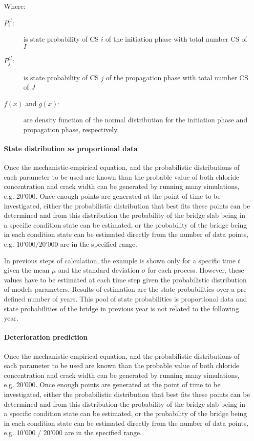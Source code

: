 Where:%
\begin{adjustwidth}{1cm}{}
\begin{description}
\item[$P_i^{cl}$:] is state probability of CS $i$ of the initiation phase with total number CS of $I$
\item[$P_j^{cl}$:] is state probability of CS $j$ of the propagation phase with total number CS of $J$
\item[$f(x)$ and $g(x)$:] are density function of the normal distribution for the initiation phase and propagation phase, respectively.
\end{description}
\end{adjustwidth}
\paragraph{State distribution as proportional data}
Once the mechanistic-empirical equation, and the probabilistic distributions of each parameter to be used are known than the probable value of both chloride concentration and crack width can be generated by running many simulations, e.g. $20’000$. Once enough points are generated at the point of time to be investigated, either the probabilistic distribution that best fits these points can be determined and from this distribution the probability of the bridge slab being in a specific condition state can be estimated, or the probability of the bridge being in each condition state can be estimated directly from the number of data points, e.g. $10’000/20’000$ are in the specified range. 

In previous steps of calculation, the example is shown only for a specific time $t$ given the mean $\mu$ and the standard deviation $\sigma$ for each process. However, these values have to be estimated at each time step given the probabilistic distribution of models parameters. Results of estimation are the state probabilities over a pre-defined number of years. This pool of state probabilities is proportional data and state probabilities of the bridge in previous year is not related to the following year.

\paragraph{Deterioration prediction}

Once the mechanistic-empirical equation, and the probabilistic distributions of each parameter to be used are known than the probable value of both chloride concentration and crack width can be generated by running many simulations, e.g. 20'000. Once enough points are generated at the point of time to be investigated, either the probabilistic distribution that best fits these points can be determined and from this distribution the probability of the bridge slab being in a specific condition state can be estimated, or the probability of the bridge being in each condition state can be estimated directly from the number of data points, e.g. 10'000 / 20'000 are in the specified range. 

